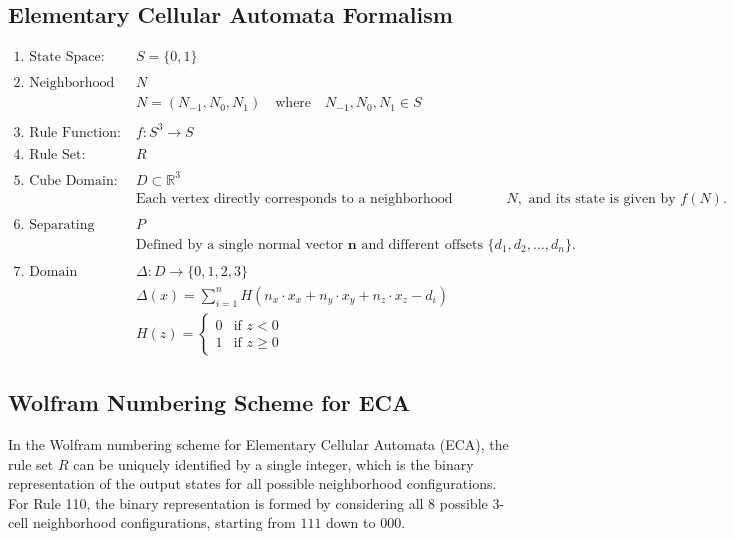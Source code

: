 \subsection{Elementary Cellular Automata Formalism}
\[
\begin{array}{lll}
\text{1. State Space:} & S = \{0, 1\} \\
\\
\text{2. Neighborhood Configuration:} & N \\
& N = (N_{-1}, N_0, N_1) \quad \text{where} \quad N_{-1}, N_0, N_1 \in S \\
\\
\text{3. Rule Function:} & f: S^3 \to S \\
\\
\text{4. Rule Set:} & R \\
\\
\text{5. Cube Domain:} & D \subset \mathbb{R}^3 \\
& \text{Each vertex directly corresponds to a neighborhood configuration } N, \text{ and its state is given by } f(N). \\
\\
\text{6. Separating Planes:} & P \\
& \text{Defined by a single normal vector } \mathbf{n} \text{ and different offsets } \{d_1, d_2, \ldots, d_n\}. \\
\\
\text{7. Domain Classification Function:} & \Delta: D \to \{0, 1, 2, 3\} \\
& \Delta(x) = \sum_{i=1}^{n} H(n_x \cdot x_x + n_y \cdot x_y + n_z \cdot x_z - d_i) \\
& H(z) = 
\begin{cases} 
0 & \text{if } z < 0 \\
1 & \text{if } z \geq 0 
\end{cases}
\end{array}
\]

\subsection{Wolfram Numbering Scheme for ECA}
In the Wolfram numbering scheme for Elementary Cellular Automata (ECA), the rule set \( R \) can be uniquely identified by a single integer, which is the binary representation of the output states for all possible neighborhood configurations. For Rule 110, the binary representation is formed by considering all 8 possible 3-cell neighborhood configurations, starting from \( 111 \) down to \( 000 \).

